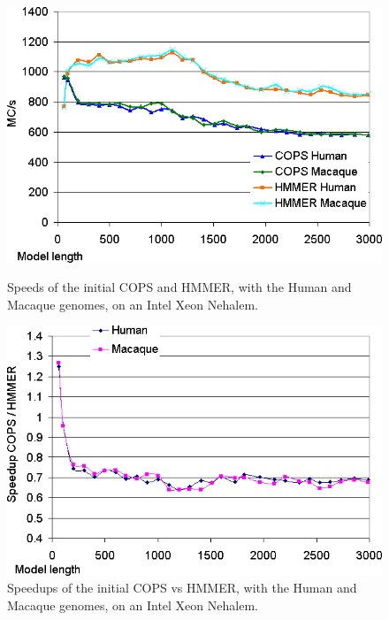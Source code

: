 \begin{figure}[h!]
    \begin{minipage}{0.48\linewidth}
		\centering
		\includegraphics[scale=0.46]{graphics/initial-tags-runtimes.png}
		\caption[Speeds for the Inter-task vectorization on an Intel Xeon Nehalem] 
		{Speeds of the initial COPS and HMMER, with the Human and Macaque genomes, on an Intel Xeon Nehalem.}
		\label{initial-tags-runtimes}
    \end{minipage}
    \hspace{0.04\linewidth}
    \begin{minipage}{0.48\linewidth}
		\centering
		\includegraphics[scale=0.46]{graphics/initial-tags-speedups.png}
		\caption[Speedups for the Inter-task vectorization on an Intel Xeon Nehalem] 
		{Speedups of the initial COPS vs HMMER, with the Human and Macaque genomes, on an Intel Xeon Nehalem.}
		\label{initial-tags-speedups}
    \end{minipage}
\end{figure} 

